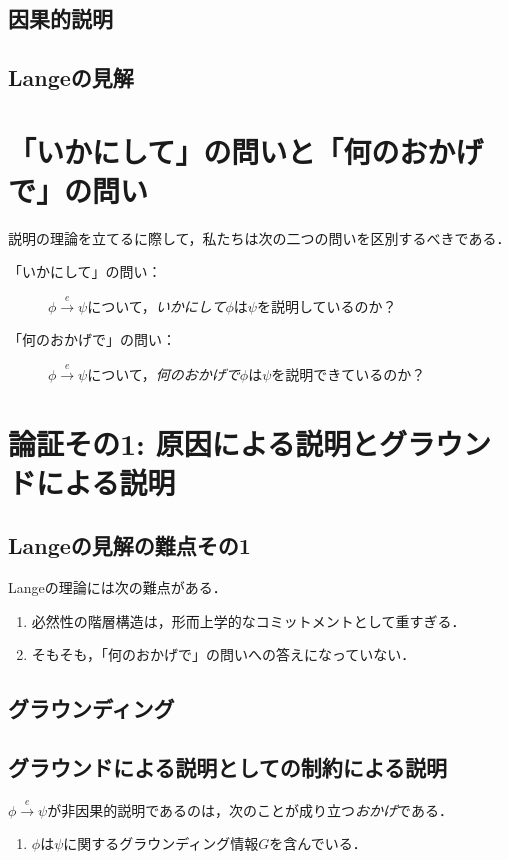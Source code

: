 \documentclass[twoside,14Q,dvipdfmx,uplatex]{jsarticle}
\theoremstyle{definition}
\begin{document}
\subsection{因果的説明}
\subsection{Langeの見解}

\section{「いかにして」の問いと「何のおかげで」の問い}\label{howandwhat}
説明の理論を立てるに際して，私たちは次の二つの問いを区別するべきである．
	\begin{description}
	\item[「いかにして」の問い：]$\phi\xrightarrow{e}\psi$について，\emph{いかにして}$\phi$は$\psi$を説明しているのか？
	\item[「何のおかげで」の問い：]$\phi\xrightarrow{e}\psi$について，\emph{何のおかげで}$\phi$は$\psi$を説明できているのか？
	\end{description}


\section{論証その1: 原因による説明とグラウンドによる説明}\label{firstargument}

\subsection{Langeの見解の難点その1}
Langeの理論には次の難点がある．
	\begin{enumerate}
	\item 必然性の階層構造は，形而上学的なコミットメントとして重すぎる．
	\item そもそも，「何のおかげで」の問いへの答えになっていない．
	\end{enumerate}

\subsection{グラウンディング}

\subsection{グラウンドによる説明としての制約による説明}
$\phi\xrightarrow{e}\psi$が非因果的説明であるのは，次のことが成り立つ\emph{おかげ}である．
	\begin{enumerate}
	\item $\phi$は$\psi$に関するグラウンディング情報$G$を含んでいる．
	\end{enumerate}
\end{document}
